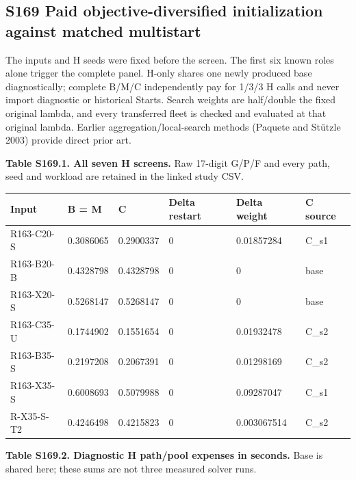 \documentclass[
  american,
  11pt,
]{article}
\newcounter{none} %
\begin{document}
\subsection{S169 Paid objective-diversified initialization against
matched
multistart}\label{s169-paid-objective-diversified-initialization-against-matched-multistart}

The inputs and H seeds were fixed before the screen. The first six known
roles alone trigger the complete panel. H-only shares one newly produced
base diagnostically; complete B/M/C independently pay for 1/3/3 H calls
and never import diagnostic or historical Starts. Search weights are
half/double the fixed original lambda, and every transferred fleet is
checked and evaluated at that original lambda. Earlier
aggregation/local-search methods (Paquete and Stützle 2003) provide
direct prior art.


\textbf{Table S169.1. All seven H screens.} Raw 17-digit G/P/F and every
path, seed and workload are retained in the linked study CSV.

{\def\LTcaptype{none} %
\begin{longtable}[]{@{}llllll@{}}
\toprule\noalign{}
Input & B = M & C & Delta restart & Delta weight & C source \\
\midrule\noalign{}
\endhead
\bottomrule\noalign{}
\endlastfoot
R163-C20-S & 0.3086065 & 0.2900337 & 0 & 0.01857284 & C\_\allowbreak{}s1 \\
R163-B20-B & 0.4328798 & 0.4328798 & 0 & 0 & base \\
R163-X20-S & 0.5268147 & 0.5268147 & 0 & 0 & base \\
R163-C35-U & 0.1744902 & 0.1551654 & 0 & 0.01932478 & C\_\allowbreak{}s2 \\
R163-B35-S & 0.2197208 & 0.2067391 & 0 & 0.01298169 & C\_\allowbreak{}s2 \\
R163-X35-S & 0.6008693 & 0.5079988 & 0 & 0.09287047 & C\_\allowbreak{}s1 \\
R-X35-S-T2 & 0.4246498 & 0.4215823 & 0 & 0.003067514 & C\_\allowbreak{}s2 \\
\end{longtable}
}


\textbf{Table S169.2. Diagnostic H path/pool expenses in seconds.} Base
is shared here; these sums are not three measured solver runs.

\Needspace{248pt}
\end{document}
